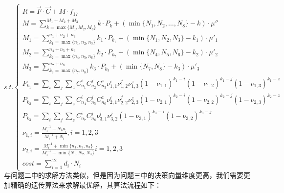 \documentclass[withoutpreface,bwprint]{cumcmthesis} %
\begin{document}
\begin{equation*}
	s.t.\begin{cases}
		R=\vec{F}\cdot \vec{C} + M\cdot f_{17}                                                                                                 \\
		M=\sum_{k=\max \{M_{1},M_{2},M_{3}\}}^{M_{1}+M_{2}+M_{3}}k\cdot P_{k}+(\min \{N_{1},N_{2},\dots,N_{8}\}-k)\cdot \mu''                  \\
		M_{1}=\sum_{k_{1}=\max \{n_{1},n_{2},n_{3}\}}^{n_{1}+n_{2}+n_{3}}k_{1}\cdot P_{k_{1}}+(\min \{N_{1},N_{2},N_{3}\}-k_{1})\cdot \mu'_{1} \\
		M_{2}=\sum_{k_{2}=\max \{n_{4},n_{5},n_{6}\}}^{n_{4}+n_{5}+n_{6}}k_{2}\cdot P_{k_{2}}+(\min \{N_{4},N_{5},N_{6}\}-k_{2})\cdot \mu'_{2} \\
		M_{3}=\sum_{k_{3}=\max \{n_{7},n_{8}\}}^{n_{7}+n_{8}}k_{3}\cdot P_{k_{3}}+(\min \{N_{7},N_{8}\}-k_{3})\cdot \mu'_{3}                   \\
		P_{k_{1}}=\sum_{i}\sum_{j}\sum_{z}C_{n_{1}}^{i}C_{n_{2}}^{j}C_{n_{3}}^{z}\nu_{1,1}^{i}\nu_{1,2}^{j}\nu_{1,3}^{z}(1-\nu_{1,1})^{k_{1}-i}(1-\nu_{1,2})^{k_{1}-j}(1-\nu_{
		1,3})^{k_{1}-z}                                                                                                                        \\
		P_{k_{2}}=\sum_{i}\sum_{j}\sum_{z}C_{n_{4}}^{i}C_{n_{5}}^{j}C_{n_{6}}^{z}\nu_{2,1}^{i}\nu_{2,2}^{j}\nu_{2,3}^{z}(1-\nu_{2,1})^{k_{2}-i}(1-\nu_{2,2})^{k_{2}-j}(1-\nu_{
		2,3})^{k_{2}-z}                                                                                                                        \\
		P_{k_{3}}=\sum_{i}\sum_{j}\sum_{z}C_{n_{7}}^{i}C_{n_{8}}^{j}\nu_{3,1}^{i}\nu_{3,2}^{j}(1-\nu_{3,1})^{k_{3}-i}(1-\nu_{3,2})^{k_{3}-j}   \\
		\nu_{1,i}=\frac{M_{i}^{-1}+N_{i}\mu_{i}}{M_{i}^{-1}+N_{i}} ,i=1,2,3                                                                    \\
		\nu_{2,i}=\frac{M_{i}^{-1}+\min \{ n_{1},n_{2},n_{3}\}}{M_{i}^{-1}+\min \{N_{1},N_{2},N_{3}\}} i=1,2,3                                 \\
		cost = \sum_{i=1}^{12}d_{i}\cdot N_{i}
	\end{cases}
\end{equation*}
与问题二中的求解方法类似，但是因为问题三中的决策向量维度更高，我们需要更加精确的遗传算法来求解最优解，其算法流程如下：
\end{document}
